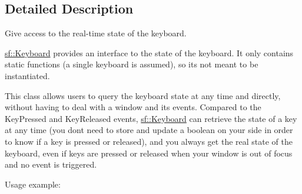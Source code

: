 \subsection{Detailed Description}
Give access to the real-\/time state of the keyboard. 

\begin{DoxyVerb}\end{DoxyVerb}


\mbox{\hyperlink{classsf_1_1_keyboard}{sf\+::\+Keyboard}} provides an interface to the state of the keyboard. It only contains static functions (a single keyboard is assumed), so it\textquotesingle{}s not meant to be instantiated.

This class allows users to query the keyboard state at any time and directly, without having to deal with a window and its events. Compared to the Key\+Pressed and Key\+Released events, \mbox{\hyperlink{classsf_1_1_keyboard}{sf\+::\+Keyboard}} can retrieve the state of a key at any time (you don\textquotesingle{}t need to store and update a boolean on your side in order to know if a key is pressed or released), and you always get the real state of the keyboard, even if keys are pressed or released when your window is out of focus and no event is triggered.

Usage example\+: 
\begin{DoxyCode}{0}
\DoxyCodeLine{\{}
\DoxyCodeLine{    \textcolor{comment}{// move left...}}
\DoxyCodeLine{\}}
\DoxyCodeLine{\{}
\DoxyCodeLine{    \textcolor{comment}{// move right...}}
\DoxyCodeLine{\}}
\DoxyCodeLine{\{}
\DoxyCodeLine{    \textcolor{comment}{// quit...}}
\DoxyCodeLine{\}}
\end{DoxyCode}


